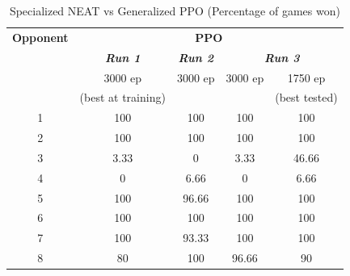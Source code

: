 \documentclass[conference]{IEEEtran}
\begin{document}
    \begin{table}[htbp]
        \caption{Specialized NEAT vs Generalized PPO (Percentage of games won)}
        \begin{center}
            \begin{tabular}{|c|c|c|c|c|}
                \hline
                \textbf{Opponent}&\multicolumn{4}{|c|}{\textbf{PPO}} \\
                \cline{2-5}
                & \textbf{\textit{Run 1}}& \textbf{\textit{Run 2}}& \multicolumn{2}{|c|}{\textbf{\textit{Run 3}}} \\
                \cline{4-5}
                & 3000 ep & 3000 ep & 3000 ep & 1750 ep\\
                & (best at training) & & & (best tested) \\
                \hline
                1 & 100 & 100 & 100 & 100 \\
                2 & 100 & 100 & 100 & 100 \\
                3 & 3.33 & 0 & 3.33 & 46.66 \\
                4 & 0 & 6.66 & 0 & 6.66 \\
                5 & 100 & 96.66 & 100 & 100 \\
                6 & 100 & 100 & 100 & 100 \\
                7 & 100 & 93.33 & 100 & 100 \\
                8 & 80 & 100 & 96.66 & 90 \\
                \hline

            \end{tabular}
        \end{center}
    \end{table}
\end{document}
